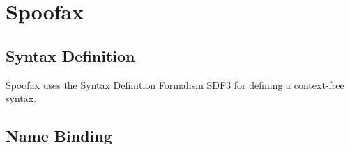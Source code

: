 \section{Spoofax}

\subsection{Syntax Definition}

Spoofax uses the Syntax Definition Formalism SDF3 for defining a context-free syntax.



\subsection{Name Binding}












